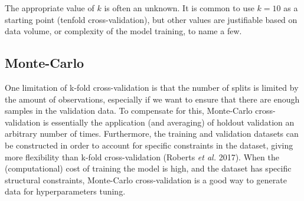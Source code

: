 \documentclass[
  letterpaper,
]{scrbook}
\begin{document}
{
\makeatletter
\def\LT@makecaption#1#2#3{%
  \noalign{\smash{\hbox{\kern\textwidth\rlap{\kern\marginparsep
  \parbox[t]{\marginparwidth}{%
    \footnotesize{%
      \vspace{(1.1\baselineskip)}
    #1{#2: }\ignorespaces #3}}}}}}%
    }
\makeatother

\begin{figure}[bt]



\end{figure}%

}

The appropriate value of \(k\) is often an unknown. It is common to use
\(k = 10\) as a starting point (tenfold cross-validation), but other
values are justifiable based on data volume, or complexity of the model
training, to name a few.

\subsection{Monte-Carlo}\label{sec-crossvalidation-montecarlo}

One limitation of k-fold cross-validation is that the number of splits
is limited by the amount of observations, especially if we want to
ensure that there are enough samples in the validation data. To
compensate for this, Monte-Carlo cross-validation is essentially the
application (and averaging) of holdout validation an arbitrary number of
times. Furthermore, the training and validation datasets can be
constructed in order to account for specific constraints in the dataset,
giving more flexibility than k-fold cross-validation (Roberts \emph{et
al.} 2017). When the (computational) cost of training the model is high,
and the dataset has specific structural constraints, Monte-Carlo
cross-validation is a good way to generate data for hyperparameters
tuning.
\end{document}

